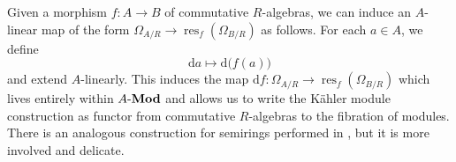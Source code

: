 \documentclass{amsart}
\theoremstyle{definition}
\DeclareMathOperator{\res}{res}
\DeclareMathOperator{\MMod}{\mathcal{Mod}}
\newcommand{\CAlg}[1]{\mathbf{CAlg}_{#1}}
\newcommand{\Mod}[1]{{#1}\textnormal{-}\mathbf{Mod}}
\newcommand{\Kah}[2]{\Omega_{{#1}/{#2}}}
\numberwithin{equation}{subsection}
\begin{document}
Given a morphism $f:A \to B$ of commutative $R$-algebras, we can induce an $A$-linear map  of the form $\Kah{A}{R} \to \res_f(\Kah{B}{R})$ as follows. For each $a \in A$, we define
\[
\mathrm{d}a \mapsto \mathrm{d}\bigg(f(a)\bigg)
\]
and extend $A$-linearly. This induces the map $\mathrm{d}f:\Kah{A}{R} \to \res_f(\Kah{B}{R})$ which lives entirely within $\Mod{A}$ and allows us to write the K{\"a}hler module construction as  functor from commutative $R$-algebras to the fibration of modules. There is an analogous  construction for semirings performed in \cite{RobinMePartialMapRigs},  but it is more involved and delicate.

%
\end{document}
